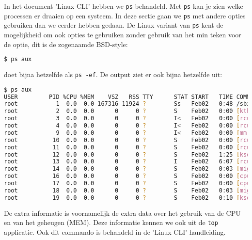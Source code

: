 In het document 'Linux CLI' hebben we \texttt{ps} behandeld. Met \texttt{ps} kan je zien welke processen er draaien op een systeem. In deze sectie gaan we \texttt{ps} met andere opties gebruiken dan we eerder hebben gedaan. De Linux variant van \texttt{ps} kent de mogelijkheid om ook opties te gebruiken zonder gebruik van het min teken voor de optie, dit is de zogenaamde BSD-style:
\begin{lstlisting}[language=bash]
$ ps aux
\end{lstlisting}
doet bijna hetzelfde als \texttt{ps -ef}. De output ziet er ook bijna hetzelfde uit:
\begin{lstlisting}[language=bash]
$ ps aux
USER         PID %CPU %MEM    VSZ   RSS TTY      STAT START   TIME COMMAND
root           1  0.0  0.0 167316 11924 ?        Ss   Feb02   0:48 /sbin/init
root           2  0.0  0.0      0     0 ?        S    Feb02   0:00 [kthreadd]
root           3  0.0  0.0      0     0 ?        I<   Feb02   0:00 [rcu_gp]
root           4  0.0  0.0      0     0 ?        I<   Feb02   0:00 [rcu_par_gp]
root           9  0.0  0.0      0     0 ?        I<   Feb02   0:00 [mm_percpu_wq]
root          10  0.0  0.0      0     0 ?        S    Feb02   0:00 [rcu_tasks_rude_]
root          11  0.0  0.0      0     0 ?        S    Feb02   0:00 [rcu_tasks_trace]
root          12  0.0  0.0      0     0 ?        S    Feb02   1:25 [ksoftirqd/0]
root          13  0.0  0.0      0     0 ?        I    Feb02   6:07 [rcu_sched]
root          14  0.0  0.0      0     0 ?        S    Feb02   0:03 [migration/0]
root          16  0.0  0.0      0     0 ?        S    Feb02   0:00 [cpuhp/0]
root          17  0.0  0.0      0     0 ?        S    Feb02   0:00 [cpuhp/1]
root          18  0.0  0.0      0     0 ?        S    Feb02   0:03 [migration/1]
root          19  0.0  0.0      0     0 ?        S    Feb02   0:10 [ksoftirqd/1]
\end{lstlisting}
De extra informatie is voornamelijk de extra data over het gebruik van de CPU en van het geheugen (MEM). Deze informatie kennen we ook uit de \texttt{top} applicatie. Ook dit commando is behandeld in de 'Linux CLI' handleiding.

